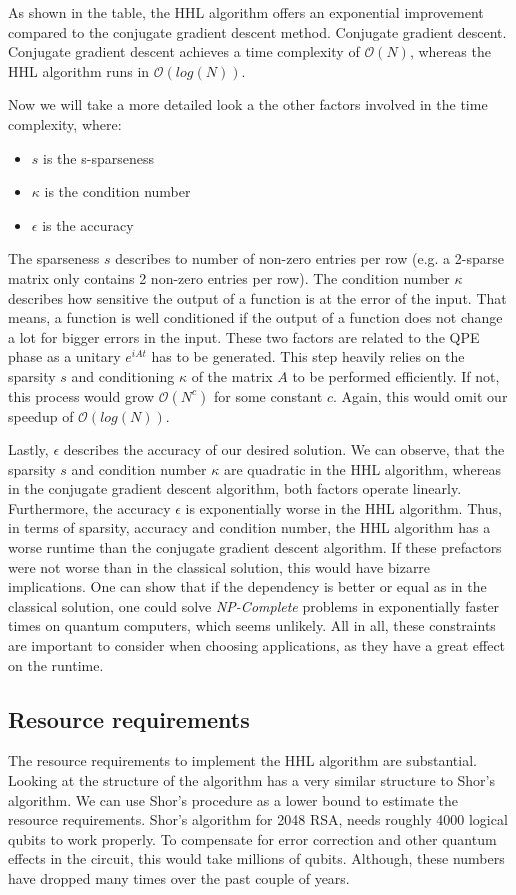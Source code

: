 As shown in the table, the HHL algorithm offers an exponential improvement compared to the conjugate gradient descent method.
Conjugate gradient descent.
Conjugate gradient descent achieves a time complexity of $\mathcal{O}(N)$, whereas the HHL algorithm runs in $\mathcal{O}(log(N))$.

Now we will take a more detailed look a the other factors involved in the time complexity, where:
\begin{itemize}
    \item $s$ is the s-sparseness
    \item $\kappa$ is the condition number
    \item $\epsilon$ is the accuracy
\end{itemize}

The sparseness $s$ describes to number of non-zero entries per row
(e.g. a 2-sparse matrix only contains 2 non-zero entries per row).
The condition number $\kappa$ describes how sensitive the output of a function is at the error of the input.
That means, a function is well conditioned if the output of a function does not change a lot for bigger errors in the input. 
These two factors are related to the QPE phase as a unitary $e^{iAt}$ has to be generated. 
This step heavily relies on the sparsity $s$ and conditioning $\kappa$ of the matrix $A$ to be performed efficiently.
If not, this process would grow $\mathcal{O}(N^c)$ for some constant $c$.
Again, this would omit our speedup of $\mathcal{O}(log(N))$.

Lastly, $\epsilon$ describes the accuracy of our desired solution.
We can observe, that the sparsity $s$ and condition number $\kappa$ are quadratic in the HHL algorithm, whereas in the conjugate gradient descent algorithm, both factors operate linearly.
Furthermore, the accuracy $\epsilon$ is exponentially worse in the HHL algorithm. 
Thus, in terms of sparsity, accuracy and condition number, the HHL algorithm has a worse runtime than the conjugate gradient descent algorithm.
If these prefactors were not worse than in the classical solution, this would have bizarre implications. 
One can show that if the dependency is better or equal as in the classical solution, one could solve \textit{NP-Complete} problems in exponentially faster times on quantum computers, which seems unlikely.
All in all, these constraints are important to consider when choosing applications, as they have a great effect on the runtime. 


\subsection{Resource requirements}
The resource requirements to implement the HHL algorithm are substantial.
Looking at the structure of the algorithm has a very similar structure to Shor's algorithm. 
We can use Shor's procedure as a lower bound to estimate the resource requirements.
Shor's algorithm for 2048 RSA, needs roughly 4000 logical qubits to work properly. 
To compensate for error correction and other quantum effects in the circuit, this would take millions of qubits. 
Although, these numbers have dropped many times over the past couple of years.
